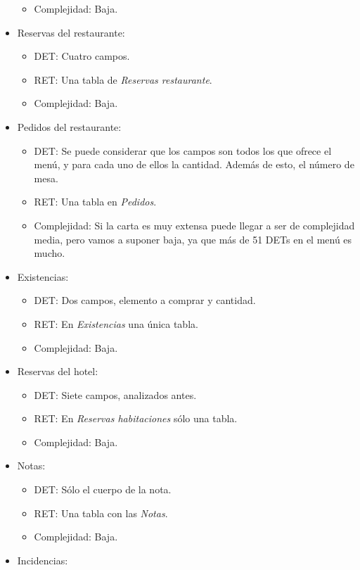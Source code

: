\documentclass[spanish,a4paper,12pt]{report}	%
\begin{document}
\begin{itemize}
\begin{itemize}
			\item{Complejidad:} Baja.
		\end{itemize}
		\item{Reservas del restaurante:} 
		\begin{itemize}
 			\item{DET:} Cuatro campos.
			\item{RET:} Una tabla de \textit{Reservas restaurante}.
			\item{Complejidad:} Baja.
		\end{itemize}
		\item{Pedidos del restaurante:} 
		\begin{itemize}
 			\item{DET:} Se puede considerar que los campos son todos los que ofrece el menú, y para cada uno de ellos la cantidad. Además de esto, el número de mesa.
			\item{RET:} Una tabla en \textit{Pedidos}.
			\item{Complejidad:} Si la carta es muy extensa puede llegar a ser de complejidad media, pero vamos a suponer baja, ya que más de 51 DETs en el menú es mucho.
		\end{itemize}
		\item{Existencias:} 
		\begin{itemize}
 			\item{DET:} Dos campos, elemento a comprar y cantidad.
			\item{RET:} En \textit{Existencias} una única tabla.
			\item{Complejidad:} Baja.
		\end{itemize}
		\item{Reservas del hotel:} 
		\begin{itemize}
 			\item{DET:} Siete campos, analizados antes.
			\item{RET:} En \textit{Reservas habitaciones} sólo una tabla.
			\item{Complejidad:} Baja.
		\end{itemize}
		\item{Notas:} 
		\begin{itemize}
 			\item{DET:} Sólo el cuerpo de la nota.
			\item{RET:} Una tabla con las \textit{Notas}.
			\item{Complejidad:} Baja.
		\end{itemize}
		\item{Incidencias:} 
		\begin{itemize}

\end{itemize}
\end{itemize}
\end{document}
